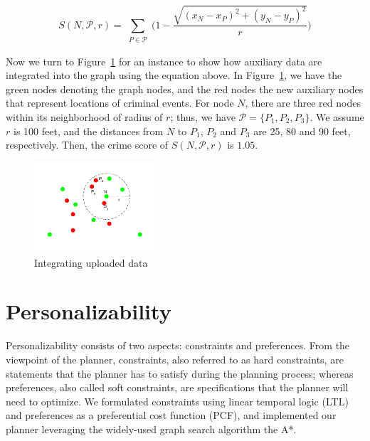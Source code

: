 \documentclass[letterpaper]{article}
\newcommand{\cP}{\mathcal{P}}
\newcommand{\figref}[1]{Figure~\ref{fig:#1}}
\begin{document}
\begin{equation*}
	S(N,\cP,r) = \sum_{\substack{P \in \cP}} 
		\Big(1 - \frac{\sqrt{(x_N-x_P)^2+(y_N-y_P)^2}}{r}\Big)
\end{equation*}

Now we turn to \figref{aux} for an instance to show how auxiliary data
are integrated into the graph using the equation above.
In \figref{aux}, we have the green nodes denoting the graph nodes, 
and the red nodes the new auxiliary nodes that represent locations
of criminal events.
For node $N$, there are three red nodes within its neighborhood of
radius of $r$; thus, we have $\cP=\{P_1,P_2,P_3\}$.
We assume $r$ is 100 feet, and the distances from $N$ to $P_1$,
$P_2$ and $P_3$ are 25, 80 and 90 feet, respectively.
Then, the crime score of $S(N,\cP,r)$ is $1.05$.

\begin{figure}[!ht]
  \centering
    \includegraphics[width=0.4\textwidth]{figs/aux.pdf}
  \caption{Integrating uploaded data\label{fig:aux}}
\end{figure}


\section{Personalizability}
Personalizability consists of two aspects: constraints and preferences.
From the viewpoint of the planner,
constraints, also referred to as hard constraints, are statements that the planner
has to satisfy during the planning process; whereas preferences, also called
soft constraints, are specifications that the planner will need to optimize.
We formulated constraints using linear temporal logic (LTL) and preferences as
a preferential cost function (PCF), and implemented our planner leveraging the
widely-used graph search algorithm the A*.
\end{document}
